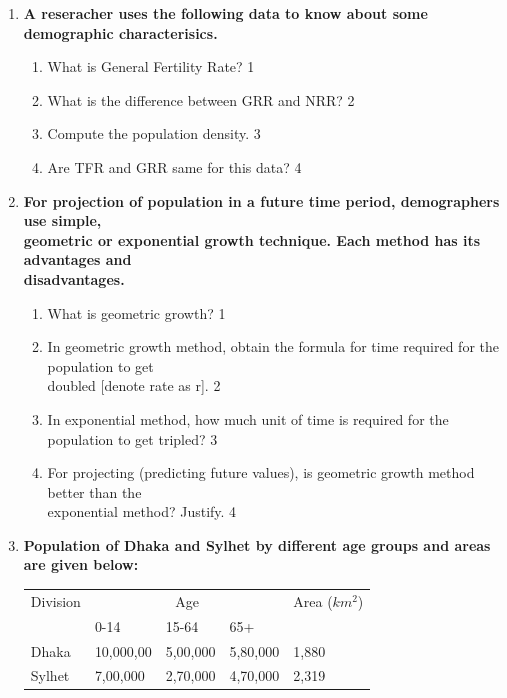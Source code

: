 \documentclass[a4paper,oneside]{book}
\begin{document}
\begin{enumerate}
  
   \item
	  \textbf{A reseracher uses the following data to know about some demographic characterisics.} 
  
  \begin{enumerate}
    \item
	What is General Fertility Rate? \hfill 1
    \item
	What is the difference between GRR and NRR? \hfill 2
    \item  
	Compute the population density. \hfill 3
    \item
	Are TFR and GRR same for this data? \hfill 4
  \end{enumerate}
  
 \item
  \textbf{For projection of population in a future time period, demographers use simple, \\ geometric or exponential growth technique. Each method has its advantages and \\ disadvantages.}

  \begin{enumerate}
    \item
	What is geometric growth? \hfill 1
    \item
    	In geometric growth method, obtain the formula for time required for the population to get \\ doubled [denote rate as r]. \hfill 2
    \item
    	In exponential method, how much unit of time is required for the population to get tripled?  \hfill 3
     \item
     	For projecting (predicting future values), is geometric growth method better than the \\ exponential method? Justify.  \hfill 4
  \end{enumerate}
  
     \item
	  \textbf{Population of Dhaka and Sylhet by different age groups and areas are given below:} 
	  
	  \begin{table}[h]
	  \begin{center}
\begin{tabular}{lllll}
Division & \multicolumn{3}{c}{Age}         & Area ($km^2$) \\
         & 0-14      & 15-64    & 65+      &               \\
Dhaka    & 10,000,00 & 5,00,000 & 5,80,000 & 1,880         \\
Sylhet   & 7,00,000  & 2,70,000 & 4,70,000 & 2,319        
\end{tabular}
\end{center}
\end{table}
  

\end{enumerate}
\end{document}
